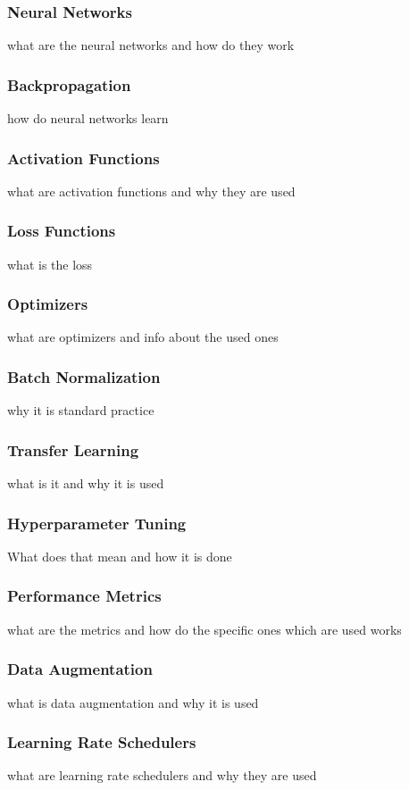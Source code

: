 \subsubsection{Neural Networks}
what are the neural networks and how do they work
\subsubsection{Backpropagation}
how do neural networks learn
\subsubsection{Activation Functions}
what are activation functions and why they are used
\subsubsection{Loss Functions}
what is the loss
\subsubsection{Optimizers}
what are optimizers and info about the used ones
\subsubsection{Batch Normalization}
why it is standard practice
\subsubsection{Transfer Learning}
what is it and why it is used
\subsubsection{Hyperparameter Tuning}
What does that mean and how it is done
\subsubsection{Performance Metrics}
what are the metrics and how do the specific ones which are used works
\subsubsection{Data Augmentation}
what is data augmentation and why it is used
\subsubsection{Learning Rate Schedulers}
what are learning rate schedulers and why they are used
